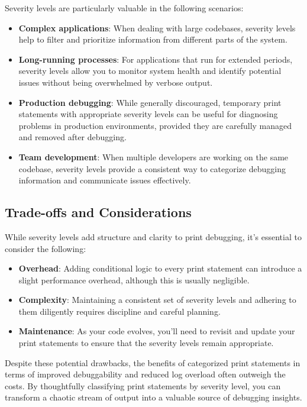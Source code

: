 \documentclass{article}
\begin{document}
{{{Severity levels are particularly valuable in the following scenarios:

\begin{itemize}
    \item \textbf{Complex applications}: When dealing with large codebases, severity levels help to filter and prioritize information from different parts of the system.
    \item \textbf{Long-running processes}: For applications that run for extended periods, severity levels allow you to monitor system health and identify potential issues without being overwhelmed by verbose output.
    \item \textbf{Production debugging}: While generally discouraged, temporary print statements with appropriate severity levels can be useful for diagnosing problems in production environments, provided they are carefully managed and removed after debugging.
    \item \textbf{Team development}: When multiple developers are working on the same codebase, severity levels provide a consistent way to categorize debugging information and communicate issues effectively.
\end{itemize}

\subsection*{Trade-offs and Considerations}

While severity levels add structure and clarity to print debugging, it's essential to consider the following:

\begin{itemize}
    \item \textbf{Overhead}:  Adding conditional logic to every print statement can introduce a slight performance overhead, although this is usually negligible.
    \item \textbf{Complexity}:  Maintaining a consistent set of severity levels and adhering to them diligently requires discipline and careful planning.
    \item \textbf{Maintenance}:  As your code evolves, you'll need to revisit and update your print statements to ensure that the severity levels remain appropriate.

\end{itemize}
Despite these potential drawbacks, the benefits of categorized print statements in terms of improved debuggability and reduced log overload often outweigh the costs. By thoughtfully classifying print statements by severity level, you can transform a chaotic stream of output into a valuable source of debugging insights.

}}}
\end{document}
